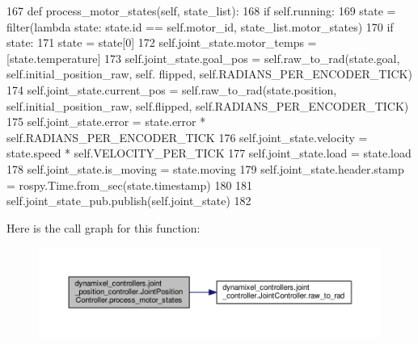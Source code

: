 \begin{DoxyCode}
167     \textcolor{keyword}{def }process\_motor\_states(self, state\_list):
168         \textcolor{keywordflow}{if} self.running:
169             state = filter(\textcolor{keyword}{lambda} state: state.id == self.motor\_id, state\_list.motor\_states)
170             \textcolor{keywordflow}{if} state:
171                 state = state[0]
172                 self.joint\_state.motor\_temps = [state.temperature]
173                 self.joint\_state.goal\_pos = self.raw\_to\_rad(state.goal, self.initial\_position\_raw, self.
      flipped, self.RADIANS\_PER\_ENCODER\_TICK)
174                 self.joint\_state.current\_pos = self.raw\_to\_rad(state.position, self.initial\_position\_raw, 
      self.flipped, self.RADIANS\_PER\_ENCODER\_TICK)
175                 self.joint\_state.error = state.error * self.RADIANS\_PER\_ENCODER\_TICK
176                 self.joint\_state.velocity = state.speed * self.VELOCITY\_PER\_TICK
177                 self.joint\_state.load = state.load
178                 self.joint\_state.is\_moving = state.moving
179                 self.joint\_state.header.stamp = rospy.Time.from\_sec(state.timestamp)
180                 
181                 self.joint\_state\_pub.publish(self.joint\_state)
182 
\end{DoxyCode}
Here is the call graph for this function\+:
\nopagebreak
\begin{figure}[H]
\begin{center}
\leavevmode
\includegraphics[width=350pt]{d1/df0/classdynamixel__controllers_1_1joint__position__controller_1_1_joint_position_controller_a3ef4e39b3b625fbdb5a9b418b97fcf05_cgraph}
\end{center}
\end{figure}
\mbox{\label{classdynamixel__controllers_1_1joint__controller_1_1_joint_controller_aed0bae387958b56f88fd707e9da9e8f1}} 
